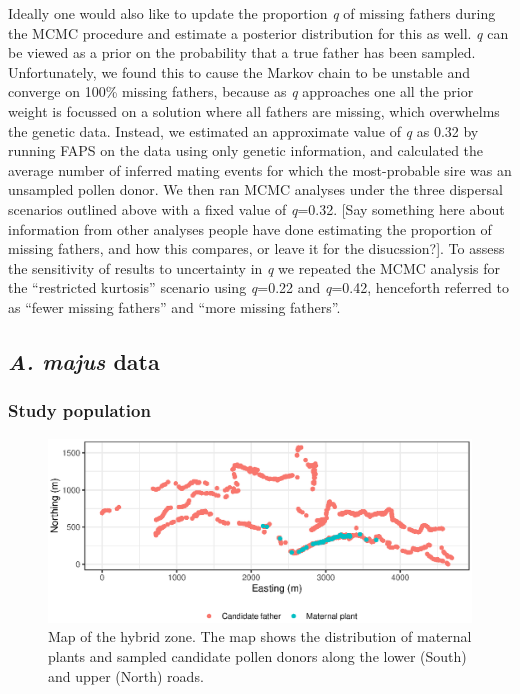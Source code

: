 \documentclass[10pt, a4paper, twocolumn]{article} %
\begin{document}
Ideally one would also like to update the proportion \textit{q} of missing fathers during the MCMC procedure and estimate a posterior distribution for this as well. \textit{q} can be viewed as a prior on the probability that a true father has been sampled. Unfortunately, we found this to cause the Markov chain to be unstable and converge on 100\% missing fathers, because as \textit{q} approaches one all the prior weight is focussed on a solution where all fathers are missing, which overwhelms the genetic data. Instead, we estimated an approximate value of \textit{q} as 0.32 by running FAPS on the data using only genetic information, and calculated the average number of inferred mating events for which the most-probable sire was an unsampled pollen donor. We then ran MCMC analyses under the three dispersal scenarios outlined above with a fixed value of \textit{q}=0.32. [Say something here about information from other analyses people have done estimating the proportion of missing fathers, and how this compares, or leave it for the disucssion?]. To assess the sensitivity of results to uncertainty in \textit{q} we repeated the MCMC analysis for the “restricted kurtosis” scenario using \textit{q}=0.22 and \textit{q}=0.42, henceforth referred to as “fewer missing fathers” and “more missing fathers”.

\subsection{\textit{A. majus} data}

\subsubsection{Study population}

\begin{figure}
    \centering
	\includegraphics[]{map.eps} %
	\caption{Map of the hybrid zone. The map shows the distribution of maternal plants and sampled candidate pollen donors along the lower (South) and upper (North) roads.}
	\label{fig:map} %
\end{figure}
\end{document}
